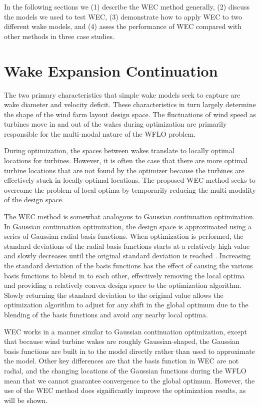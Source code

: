 \documentclass[a4paper]{jpconf}
\begin{document}
In the following sections we (1) describe the WEC method generally, (2) discuss the models we used to test WEC, (3) demonstrate how to apply WEC to two different wake models, and (4) asses the performance of WEC compared with other methods in three case studies.

\section{Wake Expansion Continuation}\label{sec:dsrop}
The two primary characteristics that simple wake models seek to capture are wake diameter and velocity deficit. These characteristics in turn largely determine the shape of the wind farm layout design space. The fluctuations of wind speed as turbines move in and out of the wakes during optimization are primarily responsible for the multi-modal nature of the WFLO problem. 

During optimization, the spaces between wakes translate to locally optimal locations for turbines. However, it is often the case that there are more optimal turbine locations that are not found by the optimizer because the turbines are effectively stuck in locally optimal locations. The proposed WEC method seeks to overcome the problem of local optima by temporarily reducing the multi-modality of the design space. 

The WEC method is somewhat analogous to Gaussian continuation optimization. In Gaussian continuation optimization, the design space is approximated using a series of Gaussian radial basis functions. When optimization is performed, the standard deviations of the radial basis functions starts at a relatively high value and slowly decreases until the original standard deviation is reached \cite{mobahi2015}. Increasing the standard deviation of the basis functions has the effect of causing the various basis functions to blend in to each other, effectively removing the local optima and providing a relatively convex design space to the optimization algorithm. Slowly returning the standard deviation to the original value allows the optimization algorithm to adjust for any shift in the global optimum due to the blending of the basis functions and avoid any nearby local optima. 

WEC works in a manner similar to Gaussian continuation optimization, except that because wind turbine wakes are roughly Gaussian-shaped, the Gaussian basis functions are built in to the model directly rather than used to approximate the model. Other key differences are that the basis function in WEC are not radial, and the changing locations of the Gaussian functions during the WFLO mean that we cannot guarantee convergence to the global optimum. However, the use of the WEC method does significantly improve the optimization results, as will be shown.
\end{document}
